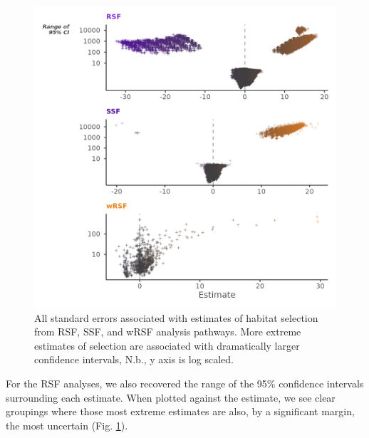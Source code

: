 \documentclass[10pt,a4paper]{article}
\begin{document}
\begin{figure}
\includegraphics[width=1\linewidth]{../figures/uncertaintyPlot} \caption{All standard errors associated with estimates of habitat selection from RSF, SSF, and wRSF analysis pathways. More extreme estimates of selection are associated with dramatically larger confidence intervals, N.b., y axis is log scaled.}\label{fig:uncertaintyPlot}
\end{figure}

For the RSF analyses, we also recovered the range of the 95\% confidence intervals surrounding each estimate.
When plotted against the estimate, we see clear groupings where those most extreme estimates are also, by a significant margin, the most uncertain (Fig. \ref{fig:uncertaintyPlot}).
\end{document}
